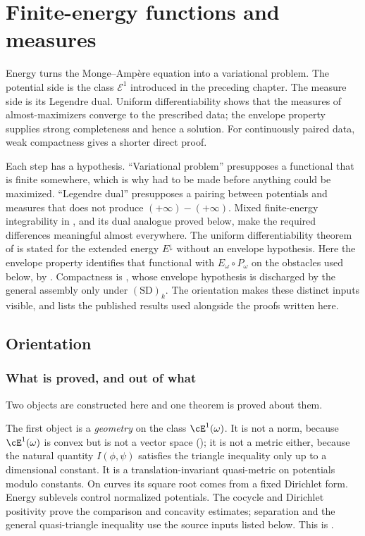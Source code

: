 \chapter{Finite-energy functions and measures}
\label{chap:bj-finite-energy}

Energy turns the Monge--Amp\`ere equation into a variational problem.  The
potential side is the class $\mathcal E^1$ introduced in the preceding
chapter.  The measure side is its Legendre dual.  Uniform differentiability
shows that the measures of almost-maximizers converge to the prescribed
data; the envelope property supplies strong completeness and hence a
solution. For continuously paired data, weak compactness gives a shorter
direct proof.

Each step has a hypothesis. ``Variational problem'' presupposes a functional that
is finite somewhere, which is why  had to be made before
anything could be maximized.  ``Legendre dual'' presupposes a pairing
between potentials and measures that does not produce
$(+\infty)-(+\infty)$. Mixed finite-energy integrability in
, and its dual analogue proved below, make the
required differences meaningful almost everywhere. The uniform
differentiability theorem of \cite[Theorem~8.5]{BJ22} is stated for
the extended energy $E^\downarrow$ without an envelope hypothesis.
Here the envelope property identifies that functional with
$E_\omega\circ P_\omega$ on the obstacles used below, by
\cite[Proposition~8.3(iv)]{BJ22}. Compactness is
, whose envelope hypothesis is discharged
by the general assembly only under $\mathrm{(SD)}_k$. The orientation makes these distinct inputs visible,
and  lists the published results used alongside
the proofs written here.

\section{Orientation}
\label{sec:ch47-orientation}

\subsection{What is proved, and out of what}
\label{sec:ch47-what}

Two objects are constructed here and one theorem is proved about them.

The first object is a \emph{geometry} on the class $\cE^1(\omega)$.  It
is not a norm, because $\cE^1(\omega)$ is convex but is not a vector
space (); it is not a metric either, because
the natural quantity $I(\phi,\psi)$ satisfies the triangle inequality
only up to a dimensional constant.  It is a translation-invariant quasi-metric on potentials modulo constants.
On curves its square root comes from a fixed Dirichlet form. Energy
sublevels control normalized potentials. The cocycle and Dirichlet
positivity prove the comparison and concavity estimates; separation and
the general quasi-triangle inequality use the source inputs listed below.  This
is .

